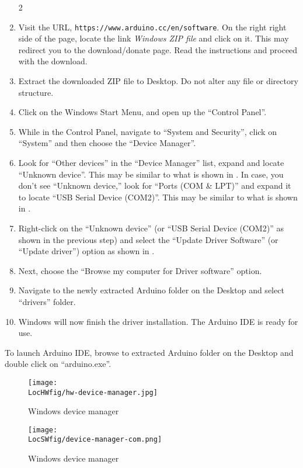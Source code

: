 \begin{enumerate}
      \setcounter{enumi}2
      \item Visit the URL, {\tt https://www.arduino.cc/en/software}. On the 
            right right side of the page, locate the link \emph{Windows ZIP file} and click on it.  
            This may redirect you to the download/donate page. Read the instructions and proceed with the
            download.
      \item Extract the downloaded ZIP file to Desktop. Do not alter any
            file or directory structure.
      \item Click on the Windows Start Menu, and open up the ``Control
            Panel''.
      \item While in the Control Panel, navigate to ``System and Security'',
            click on ``System'' and then choose the ``Device Manager''.
      \item Look for ``Other devices'' in the ``Device Manager'' list,
            expand and locate ``Unknown device''.  This may be similar to what
            is shown in . In case, you don't see  
            ``Unknown device,'' look for ``Ports (COM \& LPT)'' and expand it to locate 
            ``USB Serial Device (COM2)''.
            This may be similar to what is shown in .
      \item Right-click on the ``Unknown device'' (or ``USB Serial Device (COM2)'' as shown in 
            the previous step) and select the ``Update Driver Software'' (or ``Update driver'') option 
            as shown in . 
      \item Next, choose the ``Browse my computer for Driver software''
            option.
      \item Navigate to the newly extracted Arduino folder on the Desktop and
            select ``drivers'' folder.
      \item Windows will now finish the driver installation. The Arduino IDE
            is ready for use.
\end{enumerate}
To launch Arduino IDE, browse to extracted Arduino folder on the Desktop and double click on ``arduino.exe''.
\begin{figure}
      \centering
      \texttt{[image: \\LocHWfig/hw-device-manager.jpg]}
      \caption{Windows device manager}
      \label{win-device-manager}
\end{figure}

\begin{figure}
      \centering
      \texttt{[image: \\LocSWfig/device-manager-com.png]}
      \caption{Windows device manager}
      \label{win-device-manager-com}
\end{figure}

